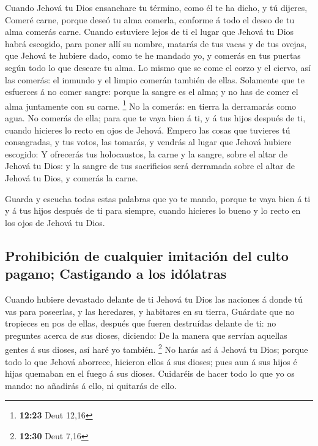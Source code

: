  Cuando Jehová tu Dios ensanchare tu término, como él te ha
dicho, y tú dijeres, Comeré carne, porque deseó tu alma comerla,
conforme á todo el deseo de tu alma comerás carne.  Cuando
estuviere lejos de ti el lugar que Jehová tu Dios habrá escogido, para
poner allí su nombre, matarás de tus vacas y de tus ovejas, que Jehová
te hubiere dado, como te he mandado yo, y comerás en tus puertas según
todo lo que deseare tu alma.  Lo mismo que se come el corzo
y el ciervo, así las comerás: el inmundo y el limpio comerán también de
ellas.  Solamente que te esfuerces á no comer sangre:
porque la sangre es el alma; y no has de comer el alma juntamente con su
carne. \footnote{\textbf{12:23} Deut 12,16}  No la comerás:
en tierra la derramarás como agua.  No comerás de ella;
para que te vaya bien á ti, y á tus hijos después de ti, cuando hicieres
lo recto en ojos de Jehová.  Empero las cosas que tuvieres
tú consagradas, y tus votos, las tomarás, y vendrás al lugar que Jehová
hubiere escogido:  Y ofrecerás tus holocaustos, la carne y
la sangre, sobre el altar de Jehová tu Dios: y la sangre de tus
sacrificios será derramada sobre el altar de Jehová tu Dios, y comerás
la carne.

 Guarda y escucha todas estas palabras que yo te mando,
porque te vaya bien á ti y á tus hijos después de ti para siempre,
cuando hicieres lo bueno y lo recto en los ojos de Jehová tu Dios.

\hypertarget{prohibiciuxf3n-de-cualquier-imitaciuxf3n-del-culto-pagano-castigando-a-los-iduxf3latras}{%
\subsection{Prohibición de cualquier imitación del culto pagano;
Castigando a los
idólatras}\label{prohibiciuxf3n-de-cualquier-imitaciuxf3n-del-culto-pagano-castigando-a-los-iduxf3latras}}

 Cuando hubiere devastado delante de ti Jehová tu Dios las
naciones á donde tú vas para poseerlas, y las heredares, y habitares en
su tierra,  Guárdate que no tropieces en pos de ellas,
después que fueren destruídas delante de ti: no preguntes acerca de sus
dioses, diciendo: De la manera que servían aquellas gentes á sus dioses,
así haré yo también. \footnote{\textbf{12:30} Deut 7,16} 
No harás así á Jehová tu Dios; porque todo lo que Jehová aborrece,
hicieron ellos á sus dioses; pues aun á sus hijos é hijas quemaban en el
fuego á sus dioses.  Cuidaréis de hacer todo lo que yo os
mando: no añadirás á ello, ni quitarás de ello.

